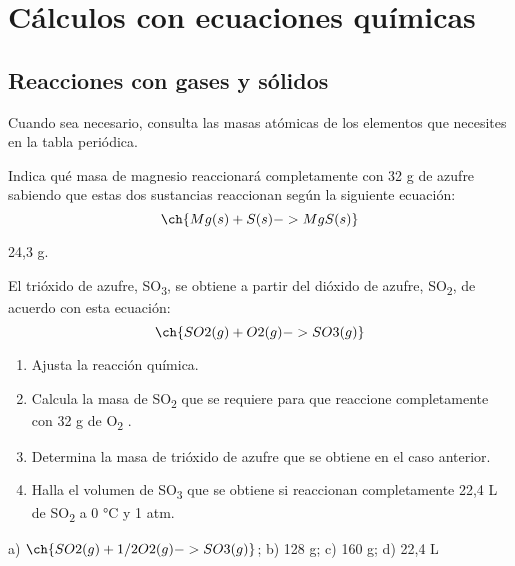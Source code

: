\documentclass[
]{article}
\author{}
\date{}
\providecommand{\tightlist}{%
  \setlength{\itemsep}{0pt}\setlength{\parskip}{0pt}}
\begin{document}
\hypertarget{cuxe1lculos-con-ecuaciones-quuxedmicas}{%
\section{Cálculos con ecuaciones
químicas}\label{cuxe1lculos-con-ecuaciones-quuxedmicas}}

\hypertarget{reacciones-con-gases-y-suxf3lidos}{%
\subsection{Reacciones con gases y
sólidos}\label{reacciones-con-gases-y-suxf3lidos}}

Cuando sea necesario, consulta las masas atómicas de los elementos que
necesites en la tabla periódica.

\begin{exercise}Indica qué masa de magnesio reaccionará completamente
con 32 g de azufre sabiendo que estas dos sustancias reaccionan según la
siguiente ecuación: \[\ch{Mg(s) + S(s) -> MgS(s)}\]\end{exercise}

\begin{solution}24,3 g.\end{solution}

\begin{exercise}El trióxido de azufre, SO\textsubscript{3}, se obtiene a
partir del dióxido de azufre, SO\textsubscript{2}, de acuerdo con esta
ecuación: \[\ch{SO2(g) + O2(g) -> SO3(g)}\]

\begin{enumerate}
\def\labelenumi{\alph{enumi})}
\tightlist
\item
  Ajusta la reacción química.
\item
  Calcula la masa de SO\textsubscript{2} que se requiere para que
  reaccione completamente con 32 g de O\textsubscript{2} .
\item
  Determina la masa de trióxido de azufre que se obtiene en el caso
  anterior.
\item
  Halla el volumen de SO\textsubscript{3} que se obtiene si reaccionan
  completamente 22,4 L de SO\textsubscript{2} a 0 °C y 1 atm.
\end{enumerate}

\end{exercise}

\begin{solution}a) \(\ch{SO2(g) + 1/2 O2(g) -> SO3(g)}\); b) 128 g; c)
160 g; d) 22,4 L\end{solution}
\end{document}
